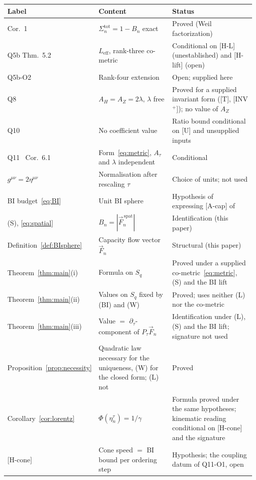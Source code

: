 \documentclass[11pt,a4paper]{article}
\begin{document}
      \smallskip
      \begin{center}
        \renewcommand{\arraystretch}{1.2}
        \begin{tabular}{p{3.4cm}p{5.2cm}p{5.4cm}}
          \hline
          Label & Content & Status \\
          \hline
          \cite{Beau2026n} Cor.~1 & $\Sigma_n^{\mathrm{tot}} = 1-B_n$ exact &
          Proved (Weil factorization) \\
          Q5b Thm.~5.2~\cite{Beau2026q5b} & $L_{\mathrm{eff}}$, rank-three co-metric &
          Conditional on [H-L] (unestablished) and [H-lift] (open) \\
          Q5b-O2 & Rank-four extension & Open; supplied here \\
          Q8~\cite{BeauQ8} & $A_H = A_Z = 2\lambda$, $\lambda$ free &
          Proved for a supplied invariant form ([T], [INV$^+$]); no value of $A_Z$ \\
          Q10~\cite{Beau2026q10} & No coefficient value &
          Ratio bound conditional on [U] and unsupplied inputs \\
          Q11~\cite{Beau2026q11} Cor.~6.1 & Form~\eqref{eq:metric}, $A_\tau$ and $\lambda$ independent &
          Conditional \\
          $g^{\mu\nu} = 2\eta^{\mu\nu}$ & Normalisation after rescaling $\tau$ &
          Choice of units; not used \\
          BI budget~\eqref{eq:BI} & Unit BI sphere &
          Hypothesis of~\cite{Beau2026n} expressing [A-cap] of~\cite{Beau2026c} \\
          (S), \eqref{eq:spatial} & $B_n = |\vec{F}_n^{\,\mathrm{spat}}|$ &
          Identification (this paper) \\
          Definition~\ref{def:BIsphere} & Capacity flow vector $\vec{F}_n$ &
          Structural (this paper) \\
          Theorem~\ref{thm:main}(i) & Formula on $S_q$ &
          Proved under a supplied co-metric~\eqref{eq:metric}, (S) and the BI lift \\
          Theorem~\ref{thm:main}(ii) & Values on $S_q$ fixed by (BI) and (W) &
          Proved; uses neither (L) nor the co-metric \\
          Theorem~\ref{thm:main}(iii) & Value $=$ $\partial_\tau$-component of $P_\tau\vec{F}_n$ &
          Identification under (L), (S) and the BI lift; signature not used \\
          Proposition~\ref{prop:necessity} & Quadratic law necessary for the uniqueness, (W) for the closed form;
          (L) not &
          Proved \\
          Corollary~\ref{cor:lorentz} & $\Phi(\eta_n^\tau) = 1/\gamma$ &
          Formula proved under the same hypotheses; kinematic reading conditional on [H-cone] and the signature \\
          {[H-cone]} & Cone speed $=$ BI bound per ordering step &
          Hypothesis; the coupling datum of Q11-O1, open \\
          \hline
        \end{tabular}
      \end{center}
\end{document}
